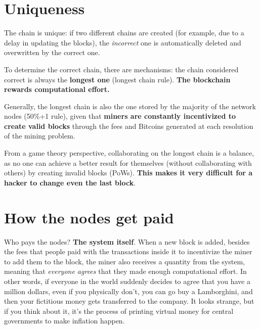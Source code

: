 \section{Uniqueness}

The chain is unique: if two different chains are created (for example, due to a delay in updating the blocks), the \textit{incorrect} one is automatically deleted and overwritten by the correct one.

To determine the correct chain, there are mechanisms: the chain considered correct is always the \textbf{longest one} (longest chain rule). \textbf{The blockchain rewards computational effort.}

Generally, the longest chain is also the one stored by the majority of the network nodes (50\%+1 rule), given that \textbf{miners are constantly incentivized to create valid blocks} through the fees and Bitcoins generated at each resolution of the mining problem. 

From a game theory perspective, collaborating on the longest chain is a balance, as no one can achieve a better result for themselves (without collaborating with others) by creating invalid blocks (PoWs). \textbf{This makes it very difficult for a hacker to change even the last block}.


\section{How the nodes get paid}

Who pays the nodes? \textbf{The system itself}. When a new block is added, besides the fees that people paid with the transactions inside it to incentivize the miner to add them to the block, the miner also receives a quantity from the system, meaning that \textit{everyone agrees} that they made enough computational effort. In other words, if everyone in the world suddenly decides to agree that you have a million dollars, even if you physically don't, you can go buy a Lamborghini, and then your fictitious money gets transferred to the company. It looks strange, but if you think about it, it's the process of printing virtual money for central governments to make inflation happen.


